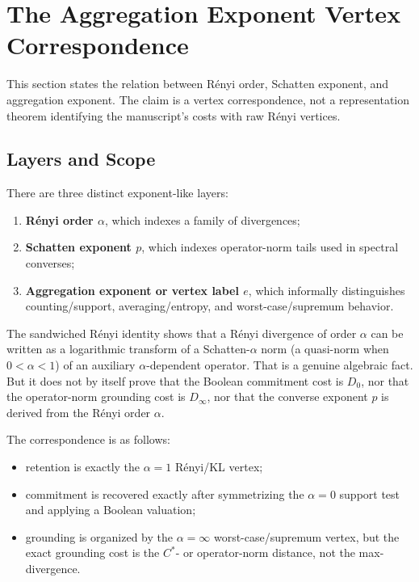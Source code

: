 \documentclass[12pt]{article}
\theoremstyle{definition}
\begin{document}
\section{The Aggregation Exponent Vertex Correspondence}
\label{sec:exponent}

This section states the relation between R\'enyi order, Schatten exponent, and
aggregation exponent.  The claim is a vertex correspondence, not a
representation theorem identifying the manuscript's costs with raw R\'enyi
vertices.

\subsection{Layers and Scope}
\label{subsec:exponent-root}

There are three distinct exponent-like layers:
\begin{enumerate}[label=(\arabic*)]
\item \textbf{R\'enyi order $\alpha$}, which indexes a family of
divergences;
\item \textbf{Schatten exponent $p$}, which indexes operator-norm tails used
in spectral converses;
\item \textbf{Aggregation exponent or vertex label $e$}, which informally
distinguishes counting/support, averaging/entropy, and
worst-case/supremum behavior.
\end{enumerate}

The sandwiched R\'enyi identity shows that a R\'enyi divergence of order
$\alpha$ can be written as a logarithmic transform of a Schatten-$\alpha$ norm
(a quasi-norm when $0<\alpha<1$)
of an auxiliary $\alpha$-dependent operator.  That is a genuine algebraic fact.
But it does not by itself prove that the Boolean commitment cost is $D_0$, nor
that the operator-norm grounding cost is $D_\infty$, nor that the converse
exponent $p$ is derived from the R\'enyi order $\alpha$.

The correspondence is as follows:
\begin{itemize}[leftmargin=1.6em]
\item retention is exactly the $\alpha=1$ R\'enyi/KL vertex;
\item commitment is recovered exactly after symmetrizing the $\alpha=0$
support test and applying a Boolean valuation;
\item grounding is organized by the $\alpha=\infty$ worst-case/supremum
vertex, but the exact grounding cost is the $C^*$- or operator-norm
distance, not the max-divergence.
\end{itemize}
\end{document}
